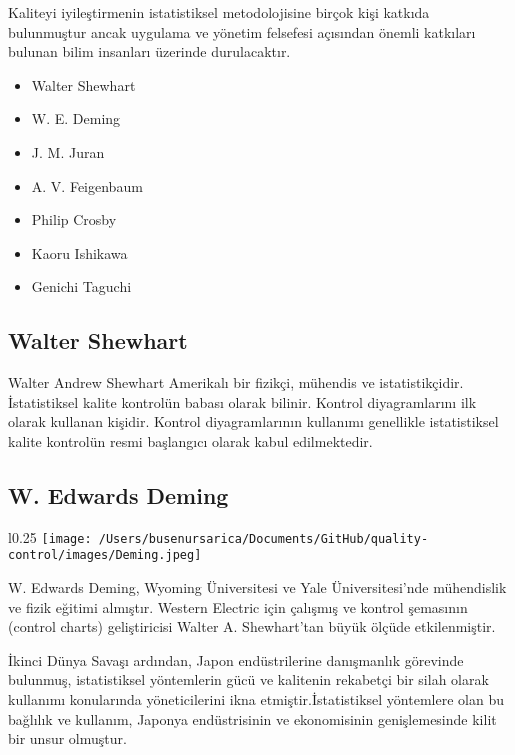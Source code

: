 \documentclass[
]{book}
\providecommand{\tightlist}{%
  \setlength{\itemsep}{0pt}\setlength{\parskip}{0pt}}
\begin{document}
Kaliteyi iyileştirmenin istatistiksel metodolojisine birçok kişi katkıda bulunmuştur ancak uygulama ve yönetim felsefesi açısından önemli katkıları bulunan bilim insanları üzerinde durulacaktır.

\begin{itemize}
\tightlist
\item
  Walter Shewhart
\item
  W. E. Deming
\item
  J. M. Juran
\item
  A. V. Feigenbaum
\item
  Philip Crosby
\item
  Kaoru Ishikawa
\item
  Genichi Taguchi
\end{itemize}

\hypertarget{walter-shewhart}{%
\subsection{Walter Shewhart}\label{walter-shewhart}}

Walter Andrew Shewhart Amerikalı bir fizikçi, mühendis ve istatistikçidir. İstatistiksel kalite kontrolün babası olarak bilinir. Kontrol diyagramlarını ilk olarak kullanan kişidir. Kontrol diyagramlarının kullanımı genellikle istatistiksel kalite kontrolün resmi başlangıcı olarak kabul edilmektedir.

\hypertarget{w.-edwards-deming}{%
\subsection{W. Edwards Deming}\label{w.-edwards-deming}}


\begin{wrapfigure}{l}{0.25\textwidth}
\texttt{[image: /Users/busenursarica/Documents/GitHub/quality-control/images/Deming.jpeg]}
\end{wrapfigure}

W. Edwards Deming, Wyoming Üniversitesi ve Yale Üniversitesi'nde mühendislik ve fizik eğitimi almıştır. Western Electric için çalışmış ve kontrol şemasının (control charts) geliştiricisi Walter A. Shewhart'tan büyük ölçüde etkilenmiştir.

İkinci Dünya Savaşı ardından, Japon endüstrilerine danışmanlık görevinde bulunmuş, istatistiksel yöntemlerin gücü ve kalitenin rekabetçi bir silah olarak kullanımı konularında yöneticilerini ikna etmiştir.İstatistiksel yöntemlere olan bu bağlılık ve kullanım, Japonya endüstrisinin ve ekonomisinin genişlemesinde kilit bir unsur olmuştur.
\end{document}
